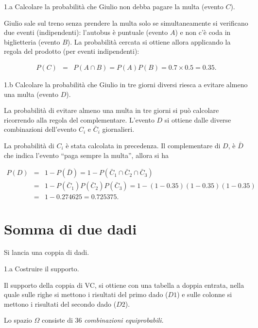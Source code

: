 \documentclass[
  11pt,
]{book}
\theoremstyle{mytheoremstyle}
\theoremstyle{mydefstyle}
\newenvironment{sol}
  {
  \begin{tcolorbox}[enhanced,breakable,arc=0.1mm,boxrule=1pt,colback=white,colframe=iblue,
  title=\bf \fontfamily{lmss}\selectfont \hspace{.5 cm} Soluzione,drop fuzzy shadow]

}{
\end{tcolorbox}
  }
\begin{document}
1.a Calcolare la probabilità che Giulio non debba pagare
la multa (evento \(C\)).

\begin{sol}
Giulio sale sul treno senza prendere la multa solo se simultaneamente
si verificano due eventi (indipendenti): l'autobus è puntuale
(evento \(A\)) e non c'è coda in biglietteria (evento \(B\)).
La probabilità cercata si ottiene allora applicando la regola del
prodotto (per eventi indipendenti):

\begin{eqnarray*}
P(C) &=& P(A \cap B) = P(A) P(B) = 0.7 \times 0.5 = 0.35  .
\end{eqnarray*}

\end{sol}

1.b Calcolare la probabilità che Giulio in tre giorni
diversi riesca a evitare almeno una multa (evento \(D\)).

\begin{sol}
La probabilità di evitare almeno una multa in tre giorni si
può calcolare ricorrendo alla regola del complementare.
L'evento \(D\) si ottiene dalle diverse combinazioni dell'evento
\(C_{i}\) e \(\bar{C}_{i}\) giornalieri.

La probabilità di \(C_{i}\) è stata calcolata in precedenza.
Il complementare di \(D\), è \(\bar{D}\) che indica l'evento
``paga sempre la multa'', allora si ha

\begin{eqnarray*}
P(D) &=& 1 - P(\bar{D})
      =  1 - P(\bar{C}_{1} \cap \bar{C}_{2} \cap \bar{C}_{3}) \\
     &=& 1 - P(\bar{C}_{1}) P(\bar{C}_{2}) P(\bar{C}_{3})
      =  1 - (1- 0.35) (1- 0.35) (1- 0.35) \\
     &=& 1-0.274625 = 0.725375  .
\end{eqnarray*}

\end{sol}

\section{Somma di due dadi}\label{somma-di-due-dadi}

Si lancia una coppia di dadi.

1.a Costruire il supporto.

\begin{sol}
Il supporto della coppia di VC, si ottiene con una tabella a
doppia entrata, nella quale sulle righe si mettono i risultati
del primo dado (\(D1\)) e sulle colonne si mettono i risultati
del secondo dado (\(D2\)).

Lo spazio \(\Omega\) consiste di 36 \emph{combinazioni equiprobabili}.

\end{sol}
\end{document}
